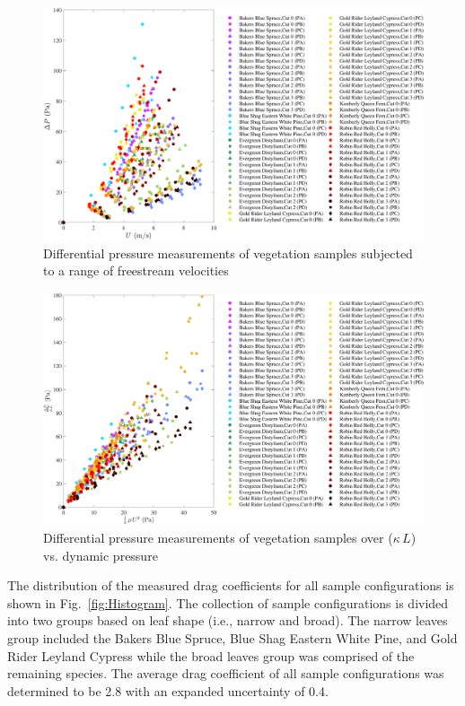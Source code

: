 \documentclass[12pt]{article}
\begin{document}
\begin{figure} [!]
	\centering
	\includegraphics[width=\textwidth,keepaspectratio]{Picture8.pdf}
	\caption[Differential pressure measurements of vegetation samples]{Differential pressure measurements of vegetation samples subjected to a range of freestream velocities}
	\label{fig:DPvU(Overall)}
\end{figure}

\begin{figure}
	\centering
	\includegraphics[width=\textwidth,keepaspectratio]{Picture9.pdf}
	\caption{Differential pressure measurements of vegetation samples over ($\kappa \, L$) vs. dynamic pressure}
	\label{fig:DPoveraf(Overall)}
\end{figure}

The distribution of the measured drag coefficients for all sample configurations is shown in Fig.~\ref{fig:Histogram}. The collection of sample configurations is divided into two groups based on leaf shape (i.e., narrow and broad). The narrow leaves group included the Bakers Blue Spruce, Blue Shag Eastern White Pine, and Gold Rider Leyland Cypress while the broad leaves group was comprised of the remaining species. The average drag coefficient of all sample configurations was determined to be 2.8 with an expanded uncertainty of 0.4.
\end{document}
